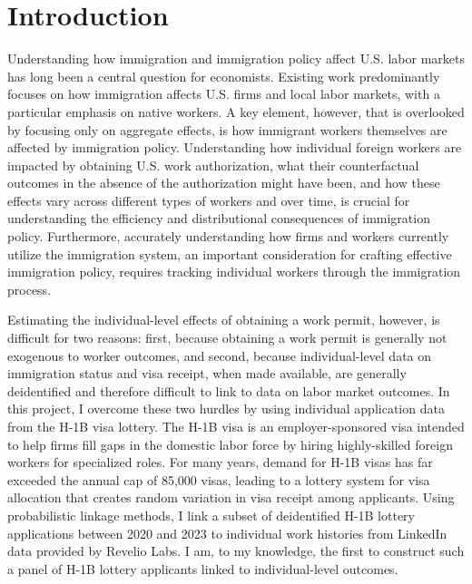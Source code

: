 \section{Introduction}
Understanding how immigration and immigration policy affect U.S. labor markets has long been a central question for economists. Existing work predominantly focuses on how immigration affects U.S. firms and local labor markets, with a particular emphasis on native workers. A key element, however, that is overlooked by focusing only on aggregate effects, is how immigrant workers themselves are affected by immigration policy. Understanding how individual foreign workers are impacted by obtaining U.S. work authorization, what their counterfactual outcomes in the absence of the authorization might have been, and how these effects vary across different types of workers and over time, is crucial for understanding the efficiency and distributional consequences of immigration policy. Furthermore, accurately understanding how firms and workers currently utilize the immigration system, an important consideration for crafting effective immigration policy, requires tracking individual workers through the immigration process.



Estimating the individual-level effects of obtaining a work permit, however, is difficult for two reasons: first, because obtaining a work permit is generally not exogenous to worker outcomes, and second, because individual-level data on immigration status and visa receipt, when made available, are generally deidentified and therefore difficult to link to data on labor market outcomes. 
In this project, I overcome these two hurdles by using individual application data from the H-1B visa lottery. The H-1B visa is an employer-sponsored visa intended to help firms fill gaps in the domestic labor force by hiring highly-skilled foreign workers for specialized roles.  
For many years, demand for H-1B visas has far exceeded the annual cap of 85,000 visas, leading to a lottery system for visa allocation that creates random variation in visa receipt among applicants. Using probabilistic linkage methods, I link a subset of deidentified H-1B lottery applications between 2020 and 2023 to individual work histories from LinkedIn data provided by Revelio Labs. I am, to my knowledge, the first to construct such a panel of H-1B lottery applicants linked to individual-level outcomes.

